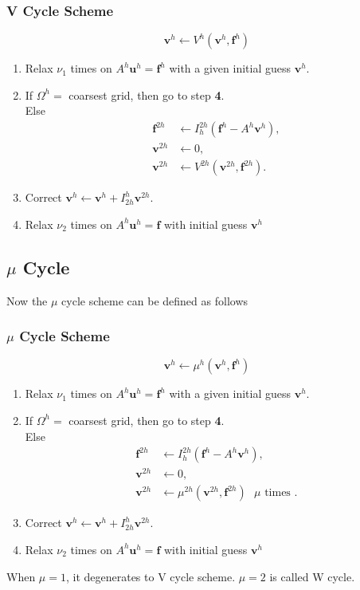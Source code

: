 \documentclass[a4paper]{report}
\begin{document}
	\subsubsection{V Cycle Scheme}
	$$ \mathbf{v}^h \leftarrow V^h(\mathbf{v}^h, \mathbf{f}^h) $$
	\begin{enumerate}
	\item Relax $\nu_1$ times on $A^h\mathbf{u}^h = \mathbf{f}^h$ with a given initial guess $\mathbf{v}^h$.
	\item If $\Omega^h = $ coarsest grid, then go to step \textbf{4}. \\
	Else
	\begin{align*}
	\mathbf{f}^{2h} &\leftarrow I_h^{2h}(\mathbf{f}^{h} - A^h\mathbf{v}^{h}), \\
	\mathbf{v}^{2h} &\leftarrow 0, \\
	\mathbf{v}^{2h} &\leftarrow V^{2h}(\mathbf{v}^{2h}, \mathbf{f}^{2h}).
	\end{align*}
	\item Correct $\mathbf{v}^h \leftarrow \mathbf{v}^h + I_{2h}^h\mathbf{v}^{2h}$.
	\item Relax $\nu_2$ times  on $A^h \mathbf{u}^h = \mathbf{f}$ with initial guess $\mathbf{v}^{h}$
	\end{enumerate}
	
	\subsection{$\mu$ Cycle}	
	Now the $\mu$ cycle scheme can be defined as follows
	\subsubsection{$\mu$ Cycle Scheme}
	$$ \mathbf{v}^h \leftarrow \mu^h(\mathbf{v}^h, \mathbf{f}^h) $$
	\begin{enumerate}
	\item Relax $\nu_1$ times on $A^h\mathbf{u}^h = \mathbf{f}^h$ with a given initial guess $\mathbf{v}^h$.
	\item If $\Omega^h = $ coarsest grid, then go to step \textbf{4}. \\
	Else
	\begin{align*}
	\mathbf{f}^{2h} &\leftarrow I_h^{2h}(\mathbf{f}^{h} - A^h\mathbf{v}^{h}), \\
	\mathbf{v}^{2h} &\leftarrow 0, \\
	\mathbf{v}^{2h} &\leftarrow \mu^{2h}(\mathbf{v}^{2h}, \mathbf{f}^{2h}) \text{ $\mu$ times }.
	\end{align*}
	\item Correct $\mathbf{v}^h \leftarrow \mathbf{v}^h + I_{2h}^h\mathbf{v}^{2h}$.
	\item Relax $\nu_2$ times  on $A^h \mathbf{u}^h = \mathbf{f}$ with initial guess $\mathbf{v}^{h}$
	\end{enumerate}
	When $\mu=1$, it degenerates to V cycle scheme. $\mu=2$ is called W cycle.
	
\end{document}
